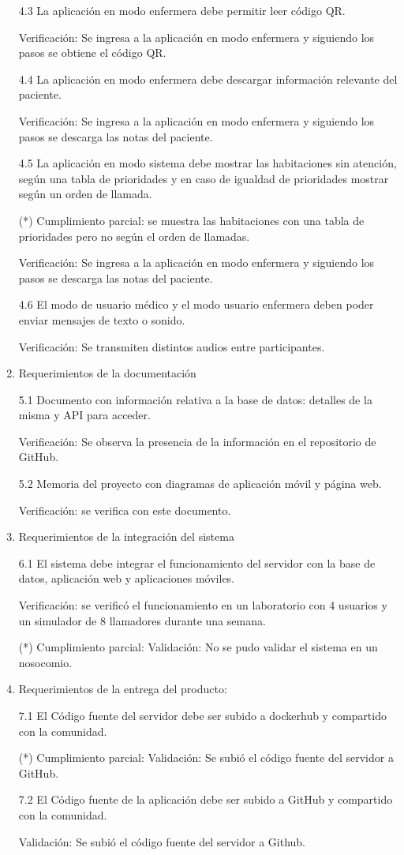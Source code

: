 \begin{enumerate}
4.3 La aplicación en modo enfermera debe permitir leer código QR.

Verificación: Se ingresa a la aplicación en modo enfermera y siguiendo los pasos se obtiene el código QR.

4.4 La aplicación en modo enfermera debe descargar información relevante del paciente.

Verificación: Se ingresa a la aplicación en modo enfermera y siguiendo los pasos se descarga las notas del paciente.

4.5 La aplicación en modo sistema debe mostrar las habitaciones sin atención, según una tabla de prioridades y en caso de igualdad de prioridades mostrar según un orden de llamada.

(*) Cumplimiento parcial: se muestra las habitaciones con una tabla de prioridades pero no según el orden de llamadas.

Verificación: Se ingresa a la aplicación en modo enfermera y siguiendo los pasos se descarga las notas del paciente.


4.6 El modo de usuario médico y el modo usuario enfermera deben poder enviar mensajes de texto o sonido.

Verificación: Se transmiten distintos audios entre participantes.

\item Requerimientos de la documentación

5.1 Documento con información relativa a la base de datos: detalles de la misma y API para acceder.

Verificación: Se observa la presencia de la información en el repositorio de GitHub.

5.2 Memoria del proyecto con diagramas de aplicación móvil y página web.

Verificación: se verifica con este documento.

\item Requerimientos de la integración del sistema

6.1 El sistema debe integrar el funcionamiento del servidor con la base de datos, aplicación web y aplicaciones móviles.

Verificación: se verificó el funcionamiento en un laboratorio con 4 usuarios y un simulador de 8 llamadores durante una semana.

(*) Cumplimiento parcial:
Validación: No se pudo validar el sistema en un nosocomio.

\item Requerimientos de la entrega del producto:

7.1 El Código fuente del servidor debe ser subido a dockerhub y compartido con la comunidad.

(*) Cumplimiento parcial:
Validación: Se subió el código fuente del servidor a GitHub.

7.2 El Código fuente de la aplicación debe ser subido a GitHub y compartido con la comunidad.

Validación: Se subió el código fuente del servidor a Github.

\end{enumerate}
